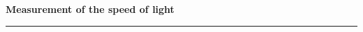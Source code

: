 
\par
\begin{center}
{\Large\textbf{Measurement of the speed of light}}


    
\par\noindent\rule{\textwidth}{0.4pt}


   
    
\end{center}

